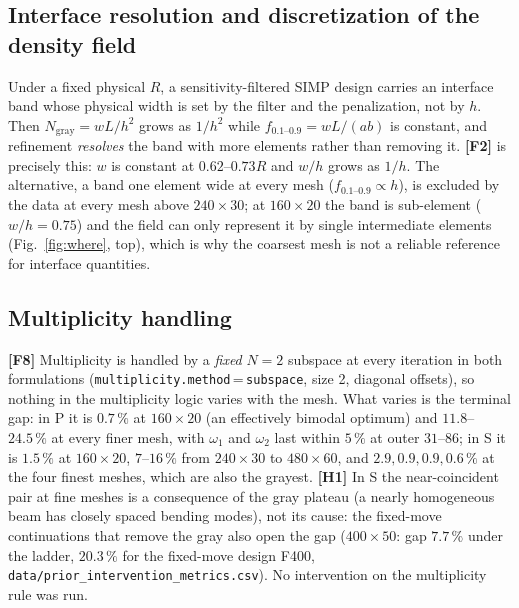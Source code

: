 \documentclass[10pt,a4paper]{article}
\newcommand{\fgray}{f_{0.1\text{--}0.9}}
\newcommand{\code}[1]{\texttt{\small #1}}
\newcommand{\fact}[1]{\textbf{[F#1]}}
\newcommand{\hyp}[1]{\textbf{[H#1]}}
\begin{document}
\subsection{Interface resolution and discretization of the density field}\label{sec:interface}
Under a fixed physical $R$, a sensitivity-filtered SIMP design carries an interface band whose physical width is set by the filter and the penalization, not by $h$. Then $N_{\mathrm{gray}}=wL/h^2$ grows as $1/h^2$ while $\fgray=wL/(ab)$ is constant, and refinement \emph{resolves} the band with more elements rather than removing it. \fact{2} is precisely this: $w$ is constant at $0.62$--$0.73R$ and $w/h$ grows as $1/h$. The alternative, a band one element wide at every mesh ($\fgray\propto h$), is excluded by the data at every mesh above $240\times30$; at $160\times20$ the band is sub-element ($w/h=0.75$) and the field can only represent it by single intermediate elements (Fig.~\ref{fig:where}, top), which is why the coarsest mesh is not a reliable reference for interface quantities.

\subsection{Multiplicity handling}\label{sec:mult}
\fact{8} Multiplicity is handled by a \emph{fixed} $N=2$ subspace at every iteration in both formulations (\code{multiplicity.method}\,=\,\code{subspace}, size 2, diagonal offsets), so nothing in the multiplicity logic varies with the mesh. What varies is the terminal gap: in P it is $0.7\,\%$ at $160\times20$ (an effectively bimodal optimum) and $11.8$--$24.5\,\%$ at every finer mesh, with $\omega_1$ and $\omega_2$ last within $5\,\%$ at outer $31$--$86$; in S it is $1.5\,\%$ at $160\times20$, $7$--$16\,\%$ from $240\times30$ to $480\times60$, and $2.9,0.9,0.9,0.6\,\%$ at the four finest meshes, which are also the grayest. \hyp{1} In S the near-coincident pair at fine meshes is a consequence of the gray plateau (a nearly homogeneous beam has closely spaced bending modes), not its cause: the fixed-move continuations that remove the gray also open the gap ($400\times50$: gap $7.7\,\%$ under the ladder, $20.3\,\%$ for the fixed-move design F400, \code{data/prior\_intervention\_metrics.csv}). No intervention on the multiplicity rule was run.
\end{document}
